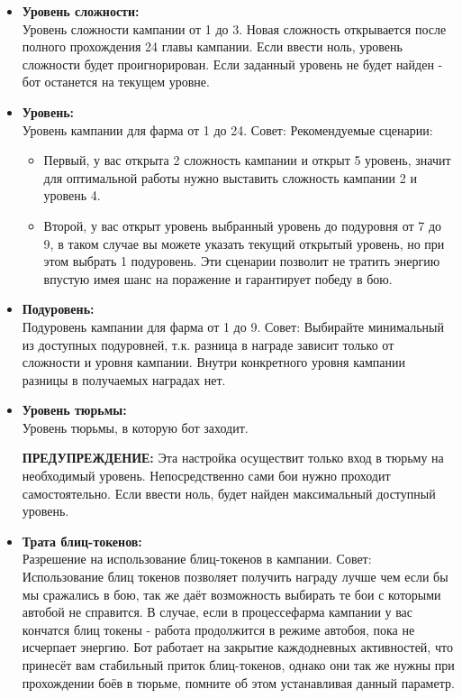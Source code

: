 \documentclass[
]{article}
\providecommand{\tightlist}{%
  \setlength{\itemsep}{0pt}\setlength{\parskip}{0pt}}
\begin{document}
\begin{itemize}
\item
  \textbf{Уровень сложности:}\\
  Уровень сложности кампании от 1 до 3. Новая сложность открывается
  после полного прохождения 24 главы кампании. Если ввести ноль, уровень
  сложности будет проигнорирован. Если заданный уровень не будет найден
  - бот останется на текущем уровне.
\item
  \textbf{Уровень:}\\
  Уровень кампании для фарма от 1 до 24. Совет: Рекомендуемые сценарии:

  \begin{itemize}
  \tightlist
  \item
    Первый, у вас открыта 2 сложность кампании и открыт 5 уровень,
    значит для оптимальной работы нужно выставить сложность кампании 2 и
    уровень 4.
  \item
    Второй, у вас открыт уровень выбранный уровень до подуровня от 7 до
    9, в таком случае вы можете указать текущий открытый уровень, но при
    этом выбрать 1 подуровень. Эти сценарии позволит не тратить энергию
    впустую имея шанс на поражение и гарантирует победу в бою.
  \end{itemize}
\item
  \textbf{Подуровень:}\\
  Подуровень кампании для фарма от 1 до 9. Совет: Выбирайте минимальный
  из доступных подуровней, т.к. разница в награде зависит только от
  сложности и уровня кампании. Внутри конкретного уровня кампании
  разницы в получаемых наградах нет.
\item
  \textbf{Уровень тюрьмы:}\\
  Уровень тюрьмы, в которую бот заходит.

  \textbf{{ПРЕДУПРЕЖДЕНИЕ:}} Эта настройка осуществит только вход в
  тюрьму на необходимый уровень. Непосредственно сами бои нужно проходит
  самостоятельно. Если ввести ноль, будет найден максимальный доступный
  уровень.
\item
  \textbf{Трата блиц-токенов:}\\
  Разрешение на использование блиц-токенов в кампании. Совет:
  Использование блиц токенов позволяет получить награду лучше чем если
  бы мы сражались в бою, так же даёт возможность выбирать те бои с
  которыми автобой не справится. В случае, если в процессефарма кампании
  у вас кончатся блиц токены - работа продолжится в режиме автобоя, пока
  не исчерпает энергию. Бот работает на закрытие каждодневных
  активностей, что принесёт вам стабильный приток блиц-токенов, однако
  они так же нужны при прохождении боёв в тюрьме, помните об этом
  устанавливая данный параметр.
\end{itemize}
\end{document}

